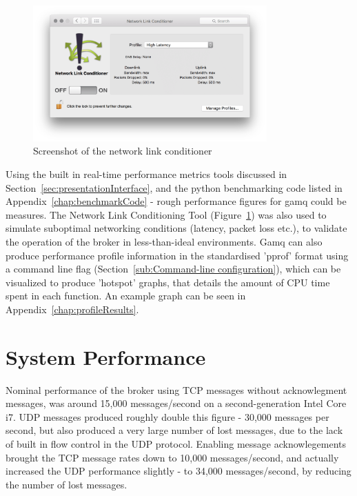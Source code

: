 \begin{figure}[htbp]
  \includegraphics[width=0.8\textwidth]{figures/networkLinkConditioner}
  \centering
  \caption{Screenshot of the network link conditioner}
  \label{fig:linkConditioner}
\end{figure}

Using the built in real-time performance metrics tools discussed in
Section~\ref{sec:presentationInterface}, and the python benchmarking code listed
in Appendix~\ref{chap:benchmarkCode} - rough performance figures for gamq could
be measures. The Network Link Conditioning Tool
(Figure~\ref{fig:linkConditioner}) was also used to simulate suboptimal
networking conditions (latency, packet loss etc.), to validate the operation of
the broker in less-than-ideal environments. Gamq can also produce performance
profile information in the standardised 'pprof' format using a command line flag
(Section~\ref{sub:Command-line configuration}), which can be visualized to
produce 'hotspot' graphs, that details the amount of CPU time spent in each
function. An example graph can be seen in Appendix~\ref{chap:profileResults}.

\section{System Performance}
\label{sec:System Performance}

Nominal performance of the broker using TCP messages without acknowlegment
messages, was around 15,000 messages/second on a second-generation Intel Core
i7. UDP messages produced roughly double this figure - 30,000 messages per
second, but also produced a very large number of lost messages, due to the lack
of built in flow control in the UDP protocol. Enabling message acknowlegements
brought the TCP message rates down to 10,000 messages/second, and actually
increased the UDP performance slightly - to 34,000 messages/second, by reducing
the number of lost messages.
